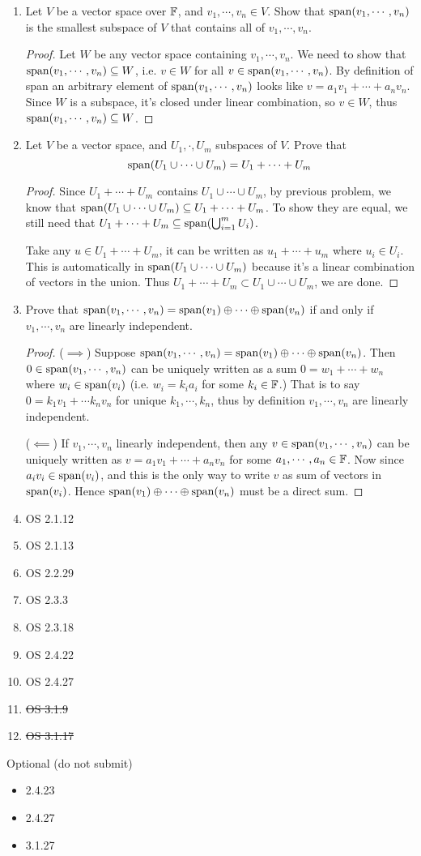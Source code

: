 \documentclass{amsart}
\begin{document}
	\begin{enumerate}
		\item Let $V$ be a vector space over $\mathbb{F}$, and $v_1,\cdots,v_n\in V$. Show that $\operatorname{span} (v_1,\cdots,v_n)$ is the  smallest subspace of $V$ that contains all of $v_1,\cdots,v_n$.
		\begin{proof}
		 Let $W$ be any vector space containing $v_1,\cdots,v_n$. We need to show that $\operatorname{span}(v_1,\cdots,v_n)\subseteq W$, i.e. $v\in W$ for all $v\in \operatorname{span}(v_1,\cdots,v_n)$. By definition of span an arbitrary element of $\operatorname{span}(v_1,\cdots,v_n)$ looks like $v=a_1v_1+\cdots+a_n v_n$. Since $W$ is a subspace, it's closed under linear combination, so $v\in W$, thus $\operatorname{span}(v_1,\cdots,v_n)\subseteq W$.
		\end{proof}
		\item Let $V$ be a vector space, and $U_1,\cdot,U_m$ subspaces of $V$. Prove that
		\[\operatorname{span}(U_1\cup \cdots \cup U_m) = U_1+\cdots+U_m\]
		\begin{proof}
			Since $U_1+\cdots+U_m$ contains $U_1\cup\cdots\cup U_m$, by previous problem, we know that $\operatorname{span}(U_1\cup\cdots\cup U_m)\subseteq U_1+\cdots+U_m$. To show they are equal, we still need that $U_1+\cdots+U_m\subseteq \operatorname{span}(\bigcup_{i=1}^{m} U_i)$.
			
			Take any $u\in U_1+\cdots+U_m$, it can be written as $u_1+\cdots+u_m$ where $u_i\in U_i$. This is automatically in $\operatorname{span}(U_1\cup \cdots \cup U_m)$ because it's a linear combination of vectors in the union. Thus $U_1+\cdots+U_m\subset U_1\cup \cdots \cup U_m$, we are done.
		\end{proof}
		\item Prove that $\operatorname{span}(v_1,\cdots,v_n) = \operatorname{span}(v_1)\oplus \cdots \oplus \operatorname{span}(v_n)$ if and only if $v_1,\cdots,v_n$ are linearly independent. 
		\begin{proof}
			($\implies$) Suppose $\operatorname{span}(v_1,\cdots,v_n) = \operatorname{span}(v_1)\oplus \cdots \oplus \operatorname{span}(v_n)$. Then $0\in\operatorname{span}(v_1,\cdots,v_n)$ can be uniquely written as a sum $0=w_1+\cdots+w_n$ where $w_i\in\operatorname{span}(v_i)$ (i.e. $w_i=k_ia_i$ for some $k_i\in\mathbb{F}$.) That is to say $0=k_1 v_1+\cdots k_n v_n$ for unique $k_1,\cdots,k_n$, thus by definition $v_1,\cdots,v_n$ are linearly independent.
			
			($\impliedby$) If $v_1,\cdots,v_n$ linearly independent, then any $v\in\operatorname{span}(v_1,\cdots,v_n)$ can be uniquely written as $v=a_1v_1+\cdots+a_nv_n$ for some $a_1,\cdots,a_n\in\mathbb{F}$. Now since $a_i v_i\in \operatorname{span}(v_i)$, and this is the only way to write $v$ as sum of vectors in $\operatorname{span}(v_i)$. Hence $\operatorname{span}(v_1)\oplus \cdots \oplus \operatorname{span}(v_n)$ must be a direct sum.
		\end{proof}
		\item OS 2.1.12
		\item OS 2.1.13
		\item OS 2.2.29
		\item OS 2.3.3
		\item OS 2.3.18
		\item OS 2.4.22
		\item OS 2.4.27
		\item \st{OS 3.1.9}
		\item \st{OS 3.1.17}
	
	 	\end{enumerate}
	 	Optional (do not submit)
	 	\begin{itemize}
	 		\item 2.4.23
	 		\item 2.4.27
	 		\item 3.1.27
	 	\end{itemize}
	
\end{document}
